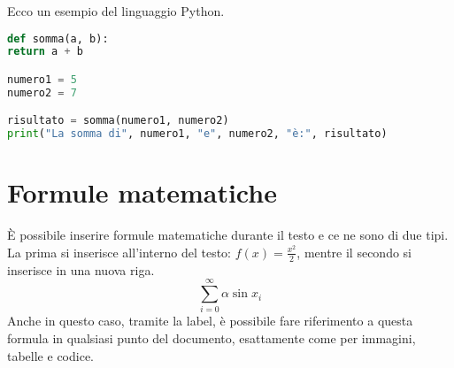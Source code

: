 Ecco un esempio del linguaggio Python.

\begin{lstlisting}[language=python, basicstyle=\small, caption={Esempio Python}, label=capitolo2:code:python]
def somma(a, b):
return a + b

numero1 = 5
numero2 = 7

risultato = somma(numero1, numero2)
print("La somma di", numero1, "e", numero2, "è:", risultato)

\end{lstlisting}


\section{Formule matematiche}
È possibile inserire formule matematiche durante il testo e ce ne sono di due tipi. La prima si inserisce all'interno del testo: $f(x) = \frac{x^2}{2}$, mentre il secondo si inserisce in una nuova riga.
\begin{equation}
    \sum_{i=0}^{\infty} \alpha\sin{x_i}
    \label{capitolo2:eq:esempioEquazione}
\end{equation}
Anche in questo caso, tramite la label, è possibile fare riferimento a questa formula in qualsiasi punto del documento, esattamente come per immagini, tabelle e codice.